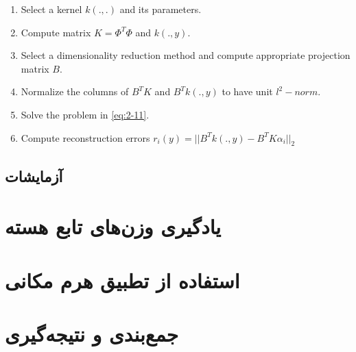 \documentclass[12pt,twocolumn]{article}
\begin{document}
\begin{latin}
\begin{algorithm}
 \begin{enumerate}
 \item Select a kernel $k(.,.)$ and its parameters.
 \item Compute matrix $K = \Phi^T\Phi$ and $k(.,y)$. 
 \item Select a dimensionality reduction method and compute appropriate projection matrix $B$.
 \item Normalize the columns of $B^TK$ and $B^Tk(.,y)$ to have unit $l^2-norm$.
 \item Solve the problem in \eqref{eq:2-11}.
 \item Compute reconstruction errors $r_i(y) = ||B^Tk(.,y) - B^TK\alpha_i||_2$
 \end{enumerate}
 
 \caption{ \cite{zhang2012kernel}}
 \label{alg:2}
\end{algorithm}
\end{latin}


\subsection{آزمایشات}





\section{یادگیری وزن‌های تابع هسته}
\section{استفاده از تطبیق هرم مکانی}
\section{جمع‌بندی و نتیجه‌گیری}
    
    
    
\newpage


\end{document}
